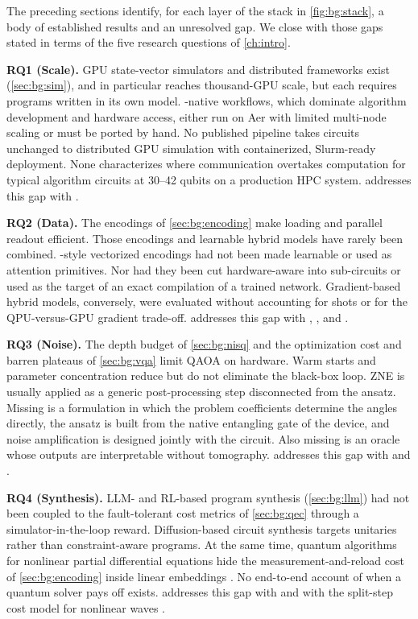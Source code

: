 The preceding sections identify, for each layer of the stack in \cref{fig:bg:stack}, a body of established results and an unresolved gap. We close with those gaps stated in terms of the five research questions of \cref{ch:intro}.

\textbf{RQ1 (Scale).} GPU state-vector simulators and distributed frameworks exist (\cref{sec:bg:sim}), and \cudaq{} in particular reaches thousand-GPU scale, but each requires programs written in its own model. \qiskit{}-native workflows, which dominate algorithm development and hardware access, either run on Aer with limited multi-node scaling or must be ported by hand. No published pipeline takes \qiskit{} circuits unchanged to distributed GPU simulation with containerized, Slurm-ready deployment. None characterizes where communication overtakes computation for typical algorithm circuits at 30--42 qubits on a production HPC system.  addresses this gap with \qgear{} \cite{guo2025qgear,guo2025qgearsoftware}.

\textbf{RQ2 (Data).} The encodings of \cref{sec:bg:encoding} make loading and parallel readout efficient. Those encodings and learnable hybrid models have rarely been combined. \qcrank{}-style vectorized encodings had not been made learnable or used as attention primitives. Nor had they been cut hardware-aware into sub-circuits or used as the target of an exact compilation of a trained network. Gradient-based hybrid models, conversely, were evaluated without accounting for shots or for the QPU-versus-GPU gradient trade-off.  addresses this gap with \qpie{} \cite{guo2025qpie}, \vqt{} \cite{guo2025vqt}, \shardq{} \cite{guo2025shardq} and \nnqa{} \cite{guo2026nnqa}.

\textbf{RQ3 (Noise).} The depth budget of \cref{sec:bg:nisq} and the optimization cost and barren plateaus of \cref{sec:bg:vqa} limit QAOA on hardware. Warm starts and parameter concentration reduce but do not eliminate the black-box loop. ZNE is usually applied as a generic post-processing step disconnected from the ansatz. Missing is a formulation in which the problem coefficients determine the angles directly, the ansatz is built from the native entangling gate of the device, and noise amplification is designed jointly with the circuit. Also missing is an oracle whose outputs are interpretable without tomography.  addresses this gap with \deal{} \cite{guo2025deal} and \qawa{} \cite{guo2025qawa}.

\textbf{RQ4 (Synthesis).} LLM- and RL-based program synthesis (\cref{sec:bg:llm}) had not been coupled to the fault-tolerant cost metrics of \cref{sec:bg:qec} through a simulator-in-the-loop reward. Diffusion-based circuit synthesis targets unitaries rather than constraint-aware programs. At the same time, quantum algorithms for nonlinear partial differential equations hide the measurement-and-reload cost of \cref{sec:bg:encoding} inside linear embeddings \cite{jin2024schrodingerization}. No end-to-end account of when a quantum solver pays off exists.  addresses this gap with \rubriq{} \cite{guo2026rubriq,guo2026rubriqsoftware} and with the split-step cost model for nonlinear waves \cite{guo2026nonlinearwaves,guo2026splitstepqude}.

